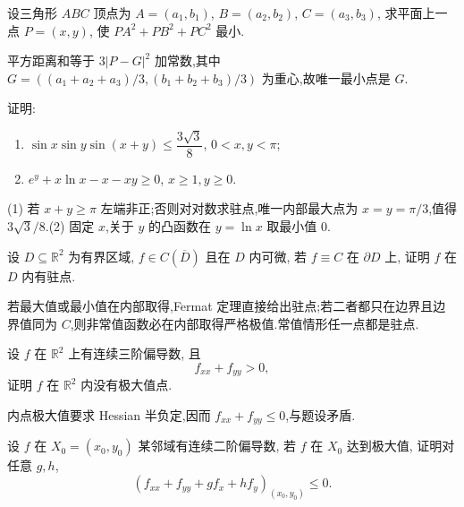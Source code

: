 \begin{example}
    设三角形 $ABC$ 顶点为 $A=(a_1,b_1)$, $B=(a_2,b_2)$, $C=(a_3,b_3)$, 求平面上一点 $P=(x,y)$, 使 $PA^2+PB^2+PC^2$ 最小.
\end{example}
\exampleblank

\begin{solution}
    平方距离和等于 $3|P-G|^2$ 加常数,其中
    $G=((a_1+a_2+a_3)/3,(b_1+b_2+b_3)/3)$ 为重心,故唯一最小点是 $G$.
\end{solution}

\begin{example}
    证明:
    \begin{enumerate}
        \item $\sin x\sin y\sin(x+y)\leq\dfrac{3\sqrt3}{8}$, $0<x,y<\pi$;
        \item $e^y+x\ln x-x-xy\geq0$, $x\geq1,y\geq0$.
    \end{enumerate}
\end{example}
\exampleblank

\begin{solution}

    (1) 若 $x+y\geq\pi$ 左端非正;否则对对数求驻点,唯一内部最大点为 $x=y=\pi/3$,值得 $3\sqrt{3}/8$.(2) 固定 $x$,关于 $y$ 的凸函数在 $y=\ln x$ 取最小值 $0$.
\end{solution}

\begin{example}
    设 $D\subseteq\mathbb{R}^2$ 为有界区域, $f\in C(\overline D)$ 且在 $D$ 内可微, 若 $f\equiv C$ 在 $\partial D$ 上, 证明 $f$ 在 $D$ 内有驻点.
\end{example}
\exampleblank

\begin{solution}
    若最大值或最小值在内部取得,Fermat 定理直接给出驻点;若二者都只在边界且边界值同为 $C$,则非常值函数必在内部取得严格极值.常值情形任一点都是驻点.
\end{solution}

\begin{example}
    设 $f$ 在 $\mathbb{R}^2$ 上有连续三阶偏导数, 且
    \[
        f_{xx}+f_{yy}>0,
    \]
    证明 $f$ 在 $\mathbb{R}^2$ 内没有极大值点.
\end{example}
\exampleblank

\begin{solution}
    内点极大值要求 Hessian 半负定,因而 $f_{xx}+f_{yy}\leq0$,与题设矛盾.
\end{solution}

\begin{example}
    设 $f$ 在 $X_0=(x_0,y_0)$ 某邻域有连续二阶偏导数, 若 $f$ 在 $X_0$ 达到极大值, 证明对任意 $g,h$,
    \[
        \left(f_{xx}+f_{yy}+gf_x+hf_y\right)_{(x_0,y_0)}\leq0.
    \]
\end{example}
\exampleblank

